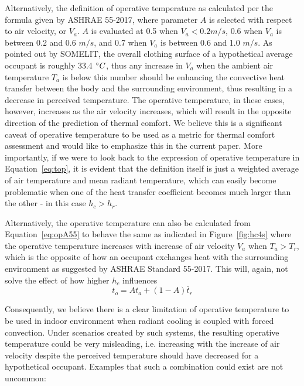     Alternatively, the definition of operative temperature as calculated per the formula given by ASHRAE 55-2017, where parameter $A$ is selected with respect to air velocity, or $V_a$. $A$ is evaluated at 0.5 when $V_a < 0.2m/s$, 0.6 when $V_a$ is between 0.2 and 0.6 $m/s$, and 0.7 when $V_a$ is between 0.6 and 1.0 $m/s$. As pointed out by SOMELIT, the overall clothing surface of a hypothetical average occupant is roughly 33.4 $\degree C$, thus any increase in $V_a$ when the ambient air temperature $T_a$ is below this number should be enhancing the convective heat transfer between the body and the surrounding environment, thus resulting in a decrease in perceived temperature. The operative temperature, in these cases, however, increases as the air velocity increases, which will result in the opposite direction of the prediction of thermal comfort. We believe this is a significant caveat of operative temperature to be used as a metric for thermal comfort assessment and would like to emphasize this in the current paper. More importantly, if we were to look back to the expression of operative temperature in Equation~\ref{eq:top}, it is evident that the definition itself is just a weighted average of air temperature and mean radiant temperature, which can easily become problematic when one of the heat transfer coefficient becomes much larger than the other - in this case $h_c > h_r$.

    Alternatively, the operative temperature can also be calculated from Equation~\ref{eq:opA55} to behave the same as indicated in Figure~\ref{fig:hc4s} where the operative temperature increases with increase of air velocity $V_a$ when $T_a > T_r$, which is the opposite of how an occupant exchanges heat with the surrounding environment as suggested by ASHRAE Standard 55-2017\cite{ansi/ashrae_standard_2017}. This will, again, not solve the effect of how higher $h_c$ influences
        \begin{equation}
            t_o = At_a + (1-A)\bar t_r\label{eq:opA55}
        \end{equation}

    Consequently, we believe there is a clear limitation of operative temperature to be used in indoor environment when radiant cooling is coupled with forced convection. Under scenarios created by such systems, the resulting operative temperature could be very misleading, i.e. increasing with the increase of air velocity despite the perceived temperature should have decreased for a hypothetical occupant. Examples that such a combination could exist are not uncommon:
